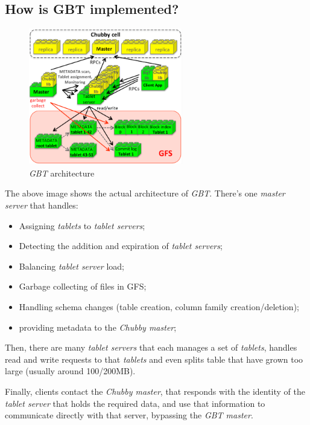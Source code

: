 \subsection{How is GBT implemented?}
\begin{figure}[h!]
    \centering
    \includegraphics[width=0.6\textwidth]{images/gbt-design-detailed.png}
    \caption{\emph{GBT} architecture}
\end{figure}

\noindent
The above image shows the actual architecture of \emph{GBT}. There's one
\emph{master server} that handles:
\begin{itemize}
    \item Assigning \emph{tablets} to \emph{tablet servers};
    \item Detecting the addition and expiration of \emph{tablet servers};
    \item Balancing \emph{tablet server} load;
    \item Garbage collecting of files in GFS;
    \item Handling schema changes (table creation, column family
    creation/deletion);
    \item providing metadata to the \emph{Chubby master};
\end{itemize}
Then, there are many \emph{tablet servers} that each manages a set of
\emph{tablets}, handles read and write requests to that \emph{tablets} and
even splits table that have grown too large (usually around 100/200MB).

Finally, clients contact the \emph{Chubby master}, that responds with the
identity of the \emph{tablet server} that holds the required data, and use that
information to communicate directly with that server, bypassing the \emph{GBT
master}.

